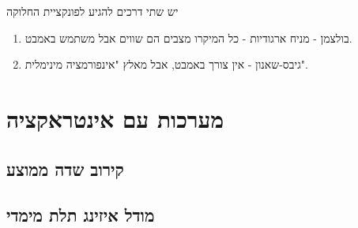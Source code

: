 \documentclass{tstextbook}
\begin{document}
\begin{corollary}
יש שתי דרכים להגיע לפונקציית החלוקה

  \begin{enumerate}
    \item בולצמן - מניח ארגודיות - כל המיקרו מצבים הם שווים אבל משתמש באמבט. 


    \item גיבס-שאנון - אין צורך באמבט, אבל מאלץ "אינפורמציה מינימלית". 


  \end{enumerate}
\end{corollary}
\chapter{מערכות עם אינטראקציה}

\section{קירוב שדה ממוצע}

\section{מודל איזינג תלת מימדי}
\end{document}
